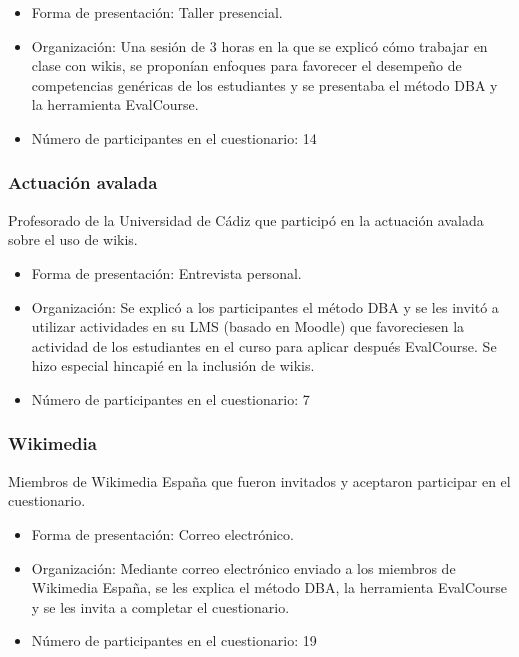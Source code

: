 	\begin{itemize}
		\item{Forma de presentación:} Taller presencial.

		\item{Organización:} Una sesión de 3 horas en la que se explicó cómo trabajar en clase con wikis, se proponían enfoques para favorecer el desempeño de competencias genéricas de los estudiantes y se presentaba el método DBA y la herramienta EvalCourse.

		\item{Número de participantes en el cuestionario:} 14
	\end{itemize}

\subsubsection*{Actuación avalada}
Profesorado de la Universidad de Cádiz que participó en la actuación avalada sobre el uso de wikis.

	\begin{itemize}
		\item{Forma de presentación:} Entrevista personal.

		\item{Organización:} Se explicó a los participantes el método DBA y se les invitó a utilizar actividades en su LMS (basado en Moodle) que favoreciesen la actividad de los estudiantes en el curso para aplicar después EvalCourse. Se hizo especial hincapié en la inclusión de wikis. 

		\item{Número de participantes en el cuestionario:} 7
	\end{itemize}

\subsubsection*{Wikimedia}
Miembros de Wikimedia España que fueron invitados y aceptaron participar en el cuestionario.

	\begin{itemize}
		\item{Forma de presentación:} Correo electrónico.

		\item{Organización:} Mediante correo electrónico enviado a los miembros de Wikimedia España, se les explica el método DBA, la herramienta EvalCourse y se les invita a completar el cuestionario.

		\item{Número de participantes en el cuestionario:} 19 %
	\end{itemize}

